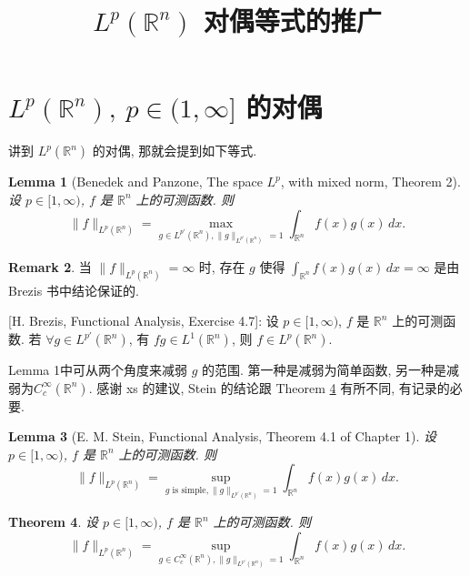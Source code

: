 \documentclass[a4paper,11pt]{article}
\title{$ L^p(\mathbb{R}^n) $ 对偶等式的推广}
\newtheorem{theorem}{Theorem}[section]
\newtheorem{lemma}[theorem]{Lemma}
\theoremstyle{definition}
\newtheorem{remark}[theorem]{Remark}
\begin{document}
\maketitle

\section{$ L^p(\mathbb{R}^n),\ p \in (1, \infty] $ 的对偶}

讲到 $ L^p(\mathbb{R}^n) $ 的对偶, 那就会提到如下等式.

\begin{lemma}[Benedek and Panzone, The space $ L^p $, with mixed norm, Theorem 2]
设 $ p \in [1, \infty) $, $ f $ 是 $ \mathbb{R}^n $ 上的可测函数. 则
$$
\| f \|_{L^p(\mathbb{R}^n)}
= \max_{g \in L^{p'}(\mathbb{R}^n), \| g \|_{L^{p'}(\mathbb{R}^n)} \, = 1}
\int_{\mathbb{R}^n} f(x) g(x) \, dx.
$$
\end{lemma}

\begin{remark}
当 $ \| f \|_{L^p(\mathbb{R}^n)} = \infty $ 时, 存在 $ g $ 使得
$ \int_{\mathbb{R}^n} f(x) g(x) \, dx = \infty $ 是由 Brezis 书中结论保证的.

[H. Brezis, Functional Analysis, Exercise 4.7]:
设 $ p \in [1, \infty) $, $ f $ 是 $ \mathbb{R}^n $ 上的可测函数.
若 $ \forall g \in L^{p'}(\mathbb{R}^n) $, 有 $ fg \in L^1(\mathbb{R}^n) $,
则 $ f \in L^p(\mathbb{R}^n) $.
\end{remark}

Lemma 1中可从两个角度来减弱 $ g $ 的范围.
第一种是减弱为简单函数, 另一种是减弱为$C_c^\infty(\mathbb{R}^n)$.
感谢 xs 的建议, Stein 的结论跟 Theorem \ref{text} 有所不同, 有记录的必要.

\begin{lemma} [E. M. Stein, Functional Analysis, Theorem 4.1 of Chapter 1] \label{123}
设 $ p \in [1, \infty) $, $ f $ 是 $ \mathbb{R}^n $ 上的可测函数. 则
\begin{equation}
\| f \|_{L^p(\mathbb{R}^n)} = \sup_{g \text{ is simple}, \| g \|_{L^{p'}(\mathbb{R}^n)} = 1}
\int_{\mathbb{R}^n} f(x) g(x) \, dx.
\end{equation}
\end{lemma}

\begin{theorem} \label{text}
设 $ p \in [1, \infty) $, $ f $ 是 $ \mathbb{R}^n $ 上的可测函数. 则
\begin{equation} \label{haha}
\| f \|_{L^p(\mathbb{R}^n)} = \sup_{g \in C_c^\infty(\mathbb{R}^n), \| g \|_{L^{p'}(\mathbb{R}^n)} = 1}
\int_{\mathbb{R}^n} f(x) g(x) \, dx.
\end{equation}
\end{theorem}
\end{document}
